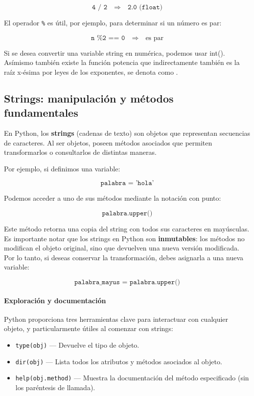 \documentclass{article}
\theoremstyle{nonumberplain}
\begin{document}
\[
\texttt{4 / 2} \quad \Rightarrow \quad \texttt{2.0 (float)}
\]

El operador \texttt{\%} es útil, por ejemplo, para determinar si un número es par:

\[
\texttt{n \% 2 == 0} \quad \Rightarrow \quad \text{es par}
\]

Si se desea convertir una variable string en numérica, podemos usar int(). Asímismo también existe la función potencia que indirectamente también es la raíz x-ésima por leyes de los exponentes, se denota como .

\subsection*{Strings: manipulación y métodos fundamentales}

En Python, los \textbf{strings} (cadenas de texto) son objetos que representan secuencias de caracteres. Al ser objetos, poseen métodos asociados que permiten transformarlos o consultarlos de distintas maneras. 

Por ejemplo, si definimos una variable:

\[
\texttt{palabra = 'hola'}
\]

Podemos acceder a uno de sus métodos mediante la notación con punto:

\[
\texttt{palabra.upper()}
\]

Este método retorna una copia del string con todos sus caracteres en mayúsculas. Es importante notar que los strings en Python son \textbf{inmutables}: los métodos no modifican el objeto original, sino que devuelven una nueva versión modificada. Por lo tanto, si deseas conservar la transformación, debes asignarla a una nueva variable:

\[
\texttt{palabra\_mayus $=$ palabra.upper()}
\]

\paragraph{Exploración y documentación}

Python proporciona tres herramientas clave para interactuar con cualquier objeto, y particularmente útiles al comenzar con strings:

\begin{itemize}
    \item \texttt{type(obj)} — Devuelve el tipo de objeto.
    \item \texttt{dir(obj)} — Lista todos los atributos y métodos asociados al objeto.
    \item \texttt{help(obj.method)} — Muestra la documentación del método especificado (sin los paréntesis de llamada).
\end{itemize}
\end{document}
